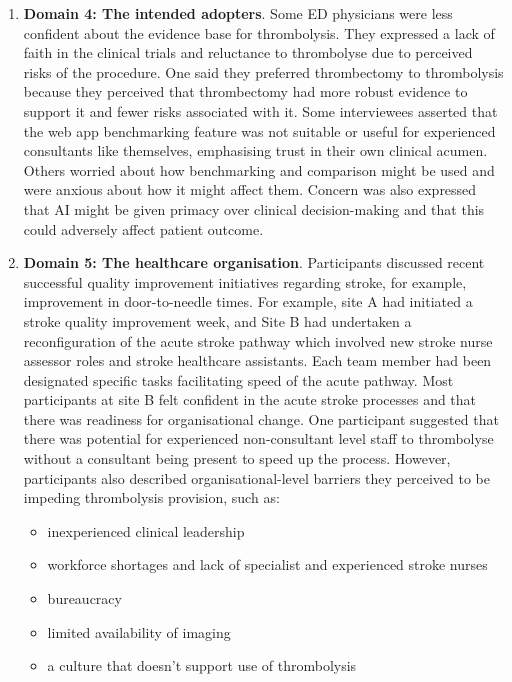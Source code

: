 \begin{enumerate}
    \item \textbf{Domain 4: The intended adopters}. Some ED physicians were less confident about the evidence base for thrombolysis. They expressed a lack of faith in the clinical trials and reluctance to thrombolyse due to perceived risks of the procedure. One said they preferred thrombectomy to thrombolysis because they perceived that thrombectomy had more robust evidence to support it and fewer risks associated with it. Some interviewees asserted that the web app benchmarking feature was not suitable or useful for experienced consultants like themselves, emphasising trust in their own clinical acumen. Others worried about how benchmarking and comparison might be used and were anxious about how it might affect them. Concern was also expressed that AI might be given primacy over clinical decision-making and that this could adversely affect patient outcome.
    \item \textbf{Domain 5: The healthcare organisation}. Participants discussed recent successful quality improvement initiatives regarding stroke, for example, improvement in door-to-needle times. For example, site A had initiated a stroke quality improvement week, and Site B had undertaken a reconfiguration of the acute stroke pathway which involved new stroke nurse assessor roles and stroke healthcare assistants. Each team member had been designated specific tasks facilitating speed of the acute pathway. Most participants at site B felt confident in the acute stroke processes and that there was readiness for organisational change. One participant suggested that there was potential for experienced non-consultant level staff to thrombolyse without a consultant being present to speed up the process. However, participants also described organisational-level barriers they perceived to be impeding thrombolysis provision, such as:
\begin{itemize}
    \item inexperienced clinical leadership

    \item workforce shortages and lack of specialist and experienced stroke nurses

    \item bureaucracy

    \item limited availability of imaging

    \item a culture that doesn't support use of thrombolysis


\end{itemize}
\end{enumerate}

